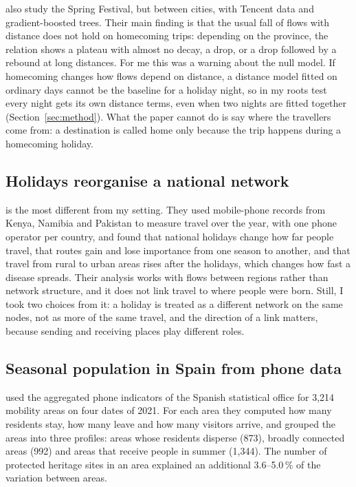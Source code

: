 \citet{luan2024different} also study the Spring Festival, but between cities, with Tencent data and gradient-boosted trees. Their main finding is that the usual fall of flows with distance does not hold on homecoming trips: depending on the province, the relation shows a plateau with almost no decay, a drop, or a drop followed by a rebound at long distances. For me this was a warning about the null model. If homecoming changes how flows depend on distance, a distance model fitted on ordinary days cannot be the baseline for a holiday night, so in my roots test every night gets its own distance terms, even when two nights are fitted together (Section~\ref{sec:method}). What the paper cannot do is say where the travellers come from: a destination is called home only because the trip happens during a homecoming holiday.

\subsection{Holidays reorganise a national network}

\citet{wesolowski2017seasonal} is the most different from my setting. They used mobile-phone records from Kenya, Namibia and Pakistan to measure travel over the year, with one phone operator per country, and found that national holidays change how far people travel, that routes gain and lose importance from one season to another, and that travel from rural to urban areas rises after the holidays, which changes how fast a disease spreads. Their analysis works with flows between regions rather than network structure, and it does not link travel to where people were born. Still, I took two choices from it: a holiday is treated as a different network on the same nodes, not as more of the same travel, and the direction of a link matters, because sending and receiving places play different roles.

\subsection{Seasonal population in Spain from phone data}

\citet{garzon2026heritage} used the aggregated phone indicators of the Spanish statistical office for 3,214 mobility areas on four dates of 2021. For each area they computed how many residents stay, how many leave and how many visitors arrive, and grouped the areas into three profiles: areas whose residents disperse (873), broadly connected areas (992) and areas that receive people in summer (1,344). The number of protected heritage sites in an area explained an additional 3.6--5.0\,\% of the variation between areas.

